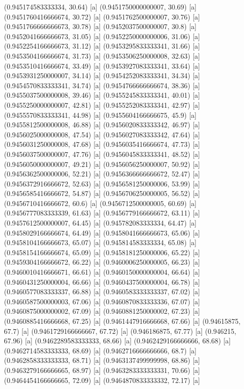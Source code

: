 {{{(0.945174583333334, 30.64) [a] 
(0.9451750000000007, 30.69) [a] 
(0.9451760416666674, 30.72) [a] 
(0.9451762500000007, 30.76) [a] 
(0.9451766666666673, 30.78) [a] 
(0.9452037500000007, 30.8) [a] 
(0.9452041666666673, 31.05) [a] 
(0.9452250000000006, 31.06) [a] 
(0.9452254166666673, 31.12) [a] 
(0.9453295833333341, 31.66) [a] 
(0.9453504166666674, 31.73) [a] 
(0.9453506250000008, 32.63) [a] 
(0.9453510416666674, 33.49) [a] 
(0.9453927083333341, 33.64) [a] 
(0.9453931250000007, 34.14) [a] 
(0.9454252083333341, 34.34) [a] 
(0.9454570833333341, 34.74) [a] 
(0.9454766666666674, 38.36) [a] 
(0.9455037500000008, 39.46) [a] 
(0.9455245833333341, 40.01) [a] 
(0.9455250000000007, 42.81) [a] 
(0.9455252083333341, 42.97) [a] 
(0.9455570833333341, 44.98) [a] 
(0.9455604166666675, 45.9) [a] 
(0.9455812500000008, 46.88) [a] 
(0.9456020833333342, 46.97) [a] 
(0.9456025000000008, 47.54) [a] 
(0.9456027083333342, 47.64) [a] 
(0.9456031250000008, 47.68) [a] 
(0.9456035416666674, 47.73) [a] 
(0.9456037500000007, 47.76) [a] 
(0.9456045833333341, 48.52) [a] 
(0.9456050000000007, 49.21) [a] 
(0.9456056250000007, 50.92) [a] 
(0.9456362500000006, 52.21) [a] 
(0.9456366666666672, 52.47) [a] 
(0.9456372916666672, 52.63) [a] 
(0.9456581250000006, 53.99) [a] 
(0.9456585416666672, 54.87) [a] 
(0.9456706250000005, 56.52) [a] 
(0.9456710416666672, 60.6) [a] 
(0.9456712500000005, 60.69) [a] 
(0.9456777083333339, 61.63) [a] 
(0.9456779166666672, 63.11) [a] 
(0.9457612500000007, 64.45) [a] 
(0.945782083333334, 64.47) [a] 
(0.9458029166666674, 64.49) [a] 
(0.9458041666666673, 65.06) [a] 
(0.9458104166666673, 65.07) [a] 
(0.945814583333334, 65.08) [a] 
(0.9458154166666674, 65.09) [a] 
(0.9458181250000006, 65.22) [a] 
(0.9459304166666672, 66.22) [a] 
(0.9460006250000005, 66.23) [a] 
(0.9460010416666671, 66.61) [a] 
(0.9460150000000004, 66.64) [a] 
(0.9460431250000004, 66.66) [a] 
(0.9460437500000004, 66.78) [a] 
(0.9460577083333337, 66.88) [a] 
(0.9460583333333337, 67.02) [a] 
(0.9460587500000003, 67.06) [a] 
(0.9460870833333336, 67.07) [a] 
(0.9460875000000002, 67.09) [a] 
(0.9460881250000002, 67.23) [a] 
(0.9460885416666668, 67.25) [a] 
(0.9461447916666668, 67.66) [a] 
(0.94615875, 67.7) [a] 
(0.9461729166666667, 67.72) [a] 
(0.946186875, 67.77) [a] 
(0.946215, 67.96) [a] 
(0.9462289583333333, 68.66) [a] 
(0.9462429166666666, 68.68) [a] 
(0.9462714583333333, 68.69) [a] 
(0.9462716666666666, 68.7) [a] 
(0.9462858333333333, 68.71) [a] 
(0.9463137499999998, 68.86) [a] 
(0.9463279166666665, 68.97) [a] 
(0.9463283333333331, 70.66) [a] 
(0.9464454166666665, 72.09) [a] 
(0.9464870833333332, 72.17) [a] 
}}}
